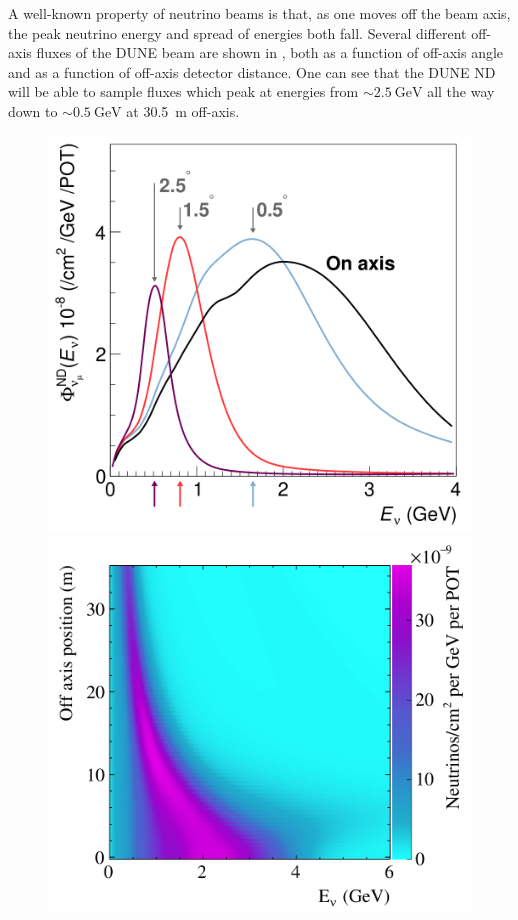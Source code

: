 A well-known property of neutrino beams is that, as one moves off the beam axis, the peak neutrino energy and spread of energies both fall.
Several different off-axis \numu fluxes of the DUNE beam are shown in , both as a function of off-axis angle and as a function of off-axis detector distance.
One can see that the DUNE ND will be able to sample fluxes which peak at energies from $\sim\SI{2.5}{\giga\electronvolt}$ all the way down to $\sim\SI{0.5}{\giga\electronvolt}$ at \SI{30.5}{\metre} off-axis.

\begin{figure}[h]
  \centering
  \begin{minipage}[t]{0.49\textwidth}
    \includegraphics[width=\linewidth]{files/figures/dune_detector/offAxisFluxes}
  \end{minipage}
  \hfill
  \begin{minipage}[t]{0.49\textwidth}
    \includegraphics[width=\linewidth]{files/figures/dune_detector/offAxisFlux2d}

\end{minipage}
\end{figure}
